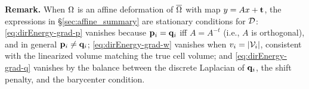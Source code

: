 \documentclass[11pt,a4paper]{article}
\begin{document}
\begin{mdframed}[backgroundcolor=blue!5, linecolor=blue!40, linewidth=1pt]
\textbf{Remark.} When $\Omega$ is an affine deformation of $\overline{\Omega}$ with map $y = Ax + \mathbf{t}$, the expressions in \S\ref{sec:affine_summary} are stationary conditions for $\mathcal{D}$: \eqref{eq:dirEnergy-grad-p} vanishes because $\mathbf{p}_i = \mathbf{q}_i$ iff $A = A^{-t}$ (i.e., $A$ is orthogonal), and in general $\mathbf{p}_i \neq \mathbf{q}_i$; \eqref{eq:dirEnergy-grad-w} vanishes when $v_i = |\mathcal{V}_i|$, consistent with the linearized volume matching the true cell volume; and \eqref{eq:dirEnergy-grad-q} vanishes by the balance between the discrete Laplacian of $\mathbf{q}_i$, the shift penalty, and the barycenter condition.
\end{mdframed}



\end{document}
